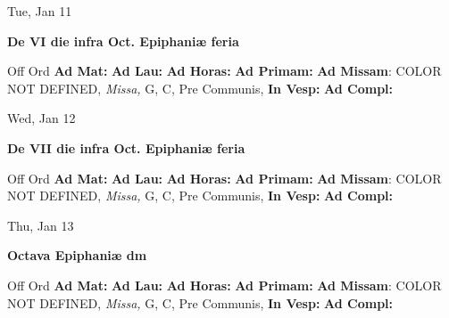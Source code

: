 \documentclass[10pt]{memoir}
\begin{document}
\begin{center}
\begin{minipage}{3.5in}
\vspace{2em}
\begin{center}Tue, Jan 11
\end{center}
\textbf{ \large De VI die infra Oct. Epiphaniæ
\textnormal{\normalsize feria}}

\begin{justify}Off Ord
\textbf{Ad Mat: }
\textbf{Ad Lau: }
\textbf{Ad Horas: }
\textbf{Ad Primam: }\textbf{Ad Missam}: COLOR NOT DEFINED, \textit{Missa,} G, C, Pre Communis, 
\textbf{In Vesp: }
\textbf{Ad Compl: }
\end{justify}
\end{minipage}
\end{center}

\begin{center}
\begin{minipage}{3.5in}
\vspace{2em}
\begin{center}Wed, Jan 12
\end{center}
\textbf{ \large De VII die infra Oct. Epiphaniæ
\textnormal{\normalsize feria}}

\begin{justify}Off Ord
\textbf{Ad Mat: }
\textbf{Ad Lau: }
\textbf{Ad Horas: }
\textbf{Ad Primam: }\textbf{Ad Missam}: COLOR NOT DEFINED, \textit{Missa,} G, C, Pre Communis, 
\textbf{In Vesp: }
\textbf{Ad Compl: }
\end{justify}
\end{minipage}
\end{center}

\begin{center}
\begin{minipage}{3.5in}
\vspace{2em}
\begin{center}Thu, Jan 13
\end{center}
\textbf{ \large Octava Epiphaniæ
\textnormal{\normalsize dm}}

\begin{justify}Off Ord
\textbf{Ad Mat: }
\textbf{Ad Lau: }
\textbf{Ad Horas: }
\textbf{Ad Primam: }\textbf{Ad Missam}: COLOR NOT DEFINED, \textit{Missa,} G, C, Pre Communis, 
\textbf{In Vesp: }
\textbf{Ad Compl: }
\end{justify}
\end{minipage}
\end{center}
\end{document}
